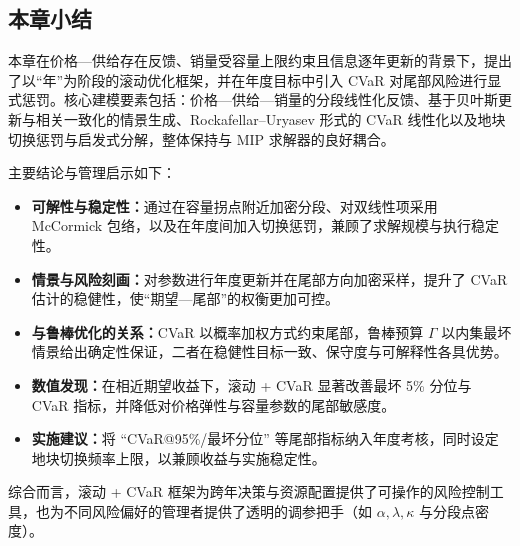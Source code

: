 \subsection{本章小结}
本章在价格—供给存在反馈、销量受容量上限约束且信息逐年更新的背景下，提出了以“年”为阶段的滚动优化框架，并在年度目标中引入 CVaR 对尾部风险进行显式惩罚。核心建模要素包括：价格—供给—销量的分段线性化反馈、基于贝叶斯更新与相关一致化的情景生成、Rockafellar–Uryasev\cite{arletti2024directional} 形式的 CVaR 线性化以及地块切换惩罚与启发式分解，整体保持与 MIP 求解器的良好耦合。

主要结论与管理启示如下：
\begin{itemize}
  \item \textbf{可解性与稳定性：}通过在容量拐点附近加密分段、对双线性项采用 McCormick 包络，以及在年度间加入切换惩罚，兼顾了求解规模与执行稳定性。
  \item \textbf{情景与风险刻画：}对参数进行年度更新并在尾部方向加密采样，提升了 CVaR 估计的稳健性，使“期望—尾部”的权衡更加可控。
  \item \textbf{与鲁棒优化的关系：}CVaR 以概率加权方式约束尾部，鲁棒预算 \(\Gamma\) 以内集最坏情景给出确定性保证，二者在稳健性目标一致、保守度与可解释性各具优势。
  \item \textbf{数值发现：}在相近期望收益下，滚动 + CVaR 显著改善最坏 5\% 分位与 CVaR 指标，并降低对价格弹性与容量参数的尾部敏感度。
  \item \textbf{实施建议：}将 “CVaR@95\%/最坏分位” 等尾部指标纳入年度考核，同时设定地块切换频率上限，以兼顾收益与实施稳定性。
\end{itemize}

综合而言，滚动 + CVaR 框架为跨年决策与资源配置提供了可操作的风险控制工具，也为不同风险偏好的管理者提供了透明的调参把手（如 \(\alpha,\lambda,\kappa\) 与分段点密度）。

